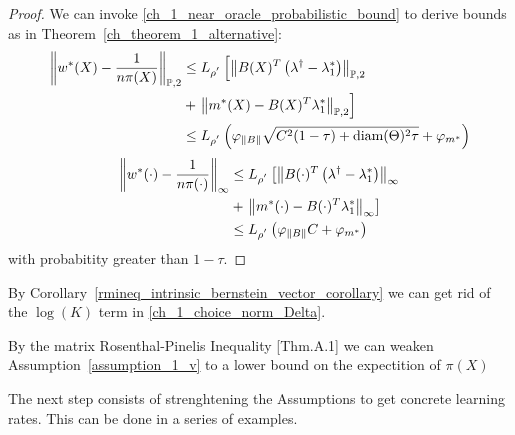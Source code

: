 \begin{proof}
We can invoke 
\eqref{ch_1_near_oracle_probabilistic_bound}
to derive bounds as in 
Theorem~\ref{ch_theorem_1_alternative}:
\begin{align*}
  \left\lVert
    w^*(X)
    -
    \frac{1}{n \pi(X)}
  \right\rVert_{\mathbb{P}, 2}
  &\le
  L_{\rho^{'}}
  \left[ 
    \left\lVert
      B(X)^T 
      \left(
        \lambda^\dagger
        -
        \lambda^*_1
      \right)
    \right\rVert_{\mathbb{P},2}
    \right.
    \\
    &+
    \left. 
    \left\lVert
      m^*(X)
      -
      B(X)^T 
      \lambda^*_1
    \right\rVert_{\mathbb{P},2}
  \right]
  \\
  &\le
  L_{\rho^{'}}
  \left(
    \varphi_{\left\lVert B\right\rVert}
    \sqrt{
      C^2(1 - \tau)
      +
      \text{diam}(\Theta)^2
      \tau
    } 
    +
    \varphi_{m^*}
  \right)
\end{align*}
\begin{align*}
  \left\lVert
    w^*(\cdot)
    -
    \frac{1}{n \pi(\cdot)}
  \right\rVert_{\infty}
  &\le
  L_{\rho^{'}}
  \left[ 
    \left\lVert
      B(\cdot)^T 
      \left(
        \lambda^\dagger
        -
        \lambda^*_1
      \right)
    \right\rVert_{\infty}
    \right.
    \\
    &+
    \left. 
    \left\lVert
      m^*(\cdot)
      -
      B(\cdot)^T 
      \lambda^*_1
    \right\rVert_{\infty}
  \right]
  \\
  &\le
  L_{\rho^{'}}
  \left(
    \varphi_{\left\lVert B\right\rVert}
    C
    +
    \varphi_{m^*}
  \right)
\end{align*}
with probabitity greater than 
$1 - \tau$.
\end{proof}
\begin{remark}
  By Corollary~\ref{rmineq_intrinsic_bernstein_vector_corollary}
  we can get rid of the $\log(K)$ term in
\eqref{ch_1_choice_norm_Delta}.
\end{remark}
\begin{remark}
  By the matrix Rosenthal-Pinelis Inequality
  \cite{Chen2012}[Thm.A.1]
  we can weaken Assumption~\ref{assumption_1_v} to a lower bound on the expectition of 
  $\pi(X)$
\end{remark}
The next step consists of strenghtening the Assumptions to get concrete learning rates.
This can be done in a series of examples.
